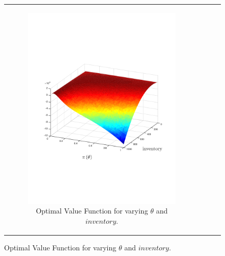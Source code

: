 {\begin{figure}[ht]
\begin{tabular}{cccc}
            \begin{subfigure}{0.24\textwidth}\centering\includegraphics[width=1.0\linewidth]{images/oe_vf_new}\caption{Optimal Value Function for varying {\footnotesize $ \theta $} and {\footnotesize $ inventory $}.}\label{fig:oe_vf}\end{subfigure}&

\end{tabular}
\end{figure}}
